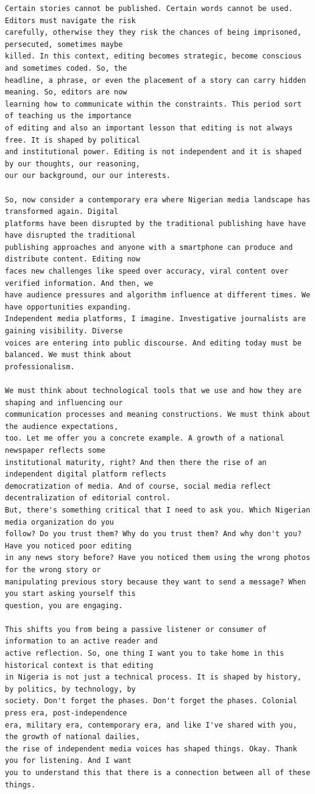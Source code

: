 {\begin{Verbatim}
Certain stories cannot be published. Certain words cannot be used. Editors must navigate the risk
carefully, otherwise they they risk the chances of being imprisoned, persecuted, sometimes maybe
killed. In this context, editing becomes strategic, become conscious and sometimes coded. So, the
headline, a phrase, or even the placement of a story can carry hidden meaning. So, editors are now
learning how to communicate within the constraints. This period sort of teaching us the importance
of editing and also an important lesson that editing is not always free. It is shaped by political
and institutional power. Editing is not independent and it is shaped by our thoughts, our reasoning,
our our background, our our interests.

So, now consider a contemporary era where Nigerian media landscape has transformed again. Digital
platforms have been disrupted by the traditional publishing have have have disrupted the traditional
publishing approaches and anyone with a smartphone can produce and distribute content. Editing now
faces new challenges like speed over accuracy, viral content over verified information. And then, we
have audience pressures and algorithm influence at different times. We have opportunities expanding.
Independent media platforms, I imagine. Investigative journalists are gaining visibility. Diverse
voices are entering into public discourse. And editing today must be balanced. We must think about
professionalism.

We must think about technological tools that we use and how they are shaping and influencing our
communication processes and meaning constructions. We must think about the audience expectations,
too. Let me offer you a concrete example. A growth of a national newspaper reflects some
institutional maturity, right? And then there the rise of an independent digital platform reflects
democratization of media. And of course, social media reflect decentralization of editorial control.
But, there's something critical that I need to ask you. Which Nigerian media organization do you
follow? Do you trust them? Why do you trust them? And why don't you? Have you noticed poor editing
in any news story before? Have you noticed them using the wrong photos for the wrong story or
manipulating previous story because they want to send a message? When you start asking yourself this
question, you are engaging.

This shifts you from being a passive listener or consumer of information to an active reader and
active reflection. So, one thing I want you to take home in this historical context is that editing
in Nigeria is not just a technical process. It is shaped by history, by politics, by technology, by
society. Don't forget the phases. Don't forget the phases. Colonial press era, post-independence
era, military era, contemporary era, and like I've shared with you, the growth of national dailies,
the rise of independent media voices has shaped things. Okay. Thank you for listening. And I want
you to understand this that there is a connection between all of these things.


\end{Verbatim}}
